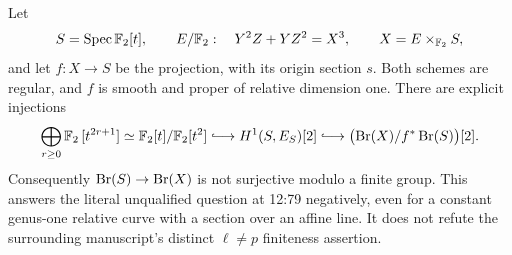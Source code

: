 \begin{theorem}
\label{thm:B-Brauer-characteristic}
Let
\[
 S=\operatorname{Spec}\mathbb F_2[t],\qquad
 E/\mathbb F_2:\quad Y^2Z+YZ^2=X^3,
 \qquad X=E\times_{\mathbb F_2}S,
\]
and let \(f:X\to S\) be the projection, with its origin section
\(s\).  Both schemes are regular, and \(f\) is smooth and proper
of relative dimension one.  There are explicit injections
\[
 \bigoplus_{r\geq0}\F_2\,[t^{2r+1}]
  \simeq \F_2[t]/\F_2[t^2]
  \lhook\joinrel\longrightarrow H^1(S,E_S)[2]
  \lhook\joinrel\longrightarrow
       \bigl(\Br(X)/f^*\Br(S)\bigr)[2].
\]
Consequently \(\operatorname{Br}(S)\to\operatorname{Br}(X)\) is not surjective modulo a
finite group.  This answers the literal unqualified question at
12:79 negatively, even for a constant genus-one relative curve with
a section over an affine line.  It does not refute the surrounding
manuscript's distinct \(\ell\ne p\) finiteness assertion.
\end{theorem}
